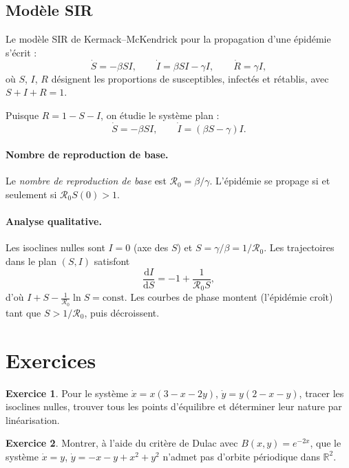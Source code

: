 \documentclass[12pt,a4paper,openany]{book}
\theoremstyle{definition}
\newtheorem{exercice}{Exercice}[chapter]
\theoremstyle{plain}
\theoremstyle{remark}
\newcommand{\R}{\mathbb{R}}
\newcommand{\dd}{\mathrm{d}}
\begin{document}
\subsection{Modèle SIR}
\label{subsec:SIR}

Le modèle SIR de Kermack--McKendrick pour
la propagation d'une épidémie s'écrit :
\begin{equation}
\label{eq:SIR}
\dot{S} = -\beta SI, \qquad
\dot{I} = \beta SI - \gamma I, \qquad
\dot{R} = \gamma I,
\end{equation}
où $S$, $I$, $R$ désignent les proportions de susceptibles, infectés
et rétablis, avec $S + I + R = 1$.

Puisque $R = 1 - S - I$, on étudie le système plan :
\[
\dot{S} = -\beta SI, \qquad
\dot{I} = (\beta S - \gamma) I.
\]

\paragraph{Nombre de reproduction de base.}
Le \emph{nombre de reproduction de base} est
$\mathcal{R}_0 = \beta / \gamma$.
L'épidémie se propage si et seulement si $\mathcal{R}_0 S(0) > 1$.

\paragraph{Analyse qualitative.}
Les isoclines nulles sont $I = 0$ (axe des $S$) et
$S = \gamma/\beta = 1/\mathcal{R}_0$. Les trajectoires dans le
plan $(S, I)$ satisfont
\[
\frac{\dd I}{\dd S} = -1 + \frac{1}{\mathcal{R}_0 S},
\]
d'où $I + S - \frac{1}{\mathcal{R}_0}\ln S = \text{const}$.
Les courbes de phase montent (l'épidémie croît) tant que
$S > 1/\mathcal{R}_0$, puis décroissent.

\section{Exercices}
\label{sec:exo-chap9}

\begin{exercice}
\label{exo:isoclines}
Pour le système $\dot{x} = x(3 - x - 2y)$,
$\dot{y} = y(2 - x - y)$, tracer les isoclines nulles, trouver tous
les points d'équilibre et déterminer leur nature par linéarisation.
\end{exercice}

\begin{exercice}
\label{exo:dulac-exo}
Montrer, à l'aide du critère de Dulac avec $B(x,y) = e^{-2x}$,
que le système $\dot{x} = y$, $\dot{y} = -x - y + x^2 + y^2$
n'admet pas d'orbite périodique dans $\R^2$.
\end{exercice}
\end{document}
